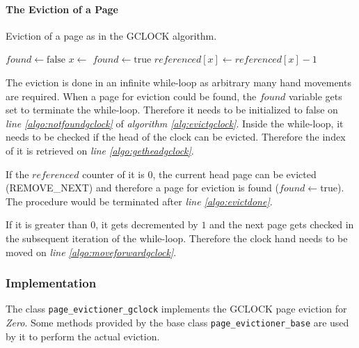 \paragraph{The Eviction of a Page}

\begin{@empty}
	\begin{algorithm}[ht!]
		\caption{Eviction of a page as in the GCLOCK algorithm.}
		\label{alg:evictgclock}
		\begin{algorithmic}[1]
				\State $found \gets \text{false}$	\label{algo:notfoundgclock}
					\State $x \gets $	\label{algo:getheadgclock}
						\State $found \gets \text{true}$
						\State {}	\label{algo:evictdone}
					\Else
						\State $referenced\left[x\right] \gets referenced\left[x\right] - 1$	\label{algo:decrement}
						\State {}	\label{algo:moveforwardgclock}
					\EndIf
				\EndWhile
			\EndProcedure
		\end{algorithmic}
	\end{algorithm}
\end{@empty}

	The eviction is done in an infinite while-loop as arbitrary many hand movements are required. When a page for eviction could be found, the $found$ variable gets set to terminate the while-loop. Therefore it needs to be initialized to false on \emph{line \ref{algo:notfoundgclock}} of \emph{algorithm \ref{alg:evictgclock}}. Inside the while-loop, it needs to be checked if the head of the clock can be evicted. Therefore the index of it is retrieved on \emph{line \ref{algo:getheadgclock}}.
	
	If the $referenced$ counter of it is $0$, the current head page can be evicted (REMOVE\_NEXT) and therefore a page for eviction is found ($found \leftarrow \text{true}$). The procedure would be terminated after \emph{line \ref{algo:evictdone}}.
	
	If it is greater than $0$, it gets decremented by $1$ and the next page gets checked in the subsequent iteration of the while-loop. Therefore the clock hand needs to be moved on \emph{line \ref{algo:moveforwardgclock}}.

\subsubsection{Implementation}

	The class \lstinline{page_evictioner_gclock} implements the GCLOCK page eviction for \emph{Zero}. Some methods provided by the base class \lstinline{page_evictioner_base} are used by it to perform the actual eviction.

